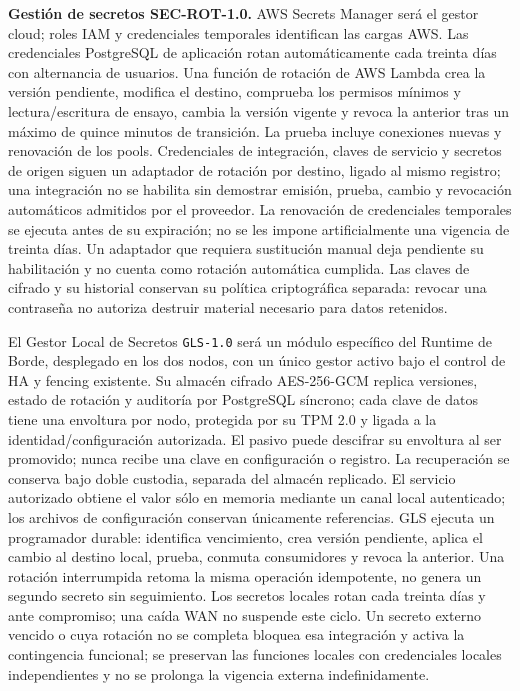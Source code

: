 \textbf{Gestión de secretos SEC-ROT-1.0.}
AWS Secrets Manager será el gestor cloud; roles IAM y credenciales temporales identifican las cargas AWS. Las credenciales PostgreSQL de aplicación rotan automáticamente cada treinta días con alternancia de usuarios. Una función de rotación de AWS Lambda crea la versión pendiente, modifica el destino, comprueba los permisos mínimos y lectura/escritura de ensayo, cambia la versión vigente y revoca la anterior tras un máximo de quince minutos de transición. La prueba incluye conexiones nuevas y renovación de los pools. Credenciales de integración, claves de servicio y secretos de origen siguen un adaptador de rotación por destino, ligado al mismo registro; una integración no se habilita sin demostrar emisión, prueba, cambio y revocación automáticos admitidos por el proveedor. La renovación de credenciales temporales se ejecuta antes de su expiración; no se les impone artificialmente una vigencia de treinta días. Un adaptador que requiera sustitución manual deja pendiente su habilitación y no cuenta como rotación automática cumplida. Las claves de cifrado y su historial conservan su política criptográfica separada: revocar una contraseña no autoriza destruir material necesario para datos retenidos.

El Gestor Local de Secretos \texttt{GLS-1.0} será un módulo específico del Runtime de Borde, desplegado en los dos nodos, con un único gestor activo bajo el control de HA y fencing existente. Su almacén cifrado AES-256-GCM replica versiones, estado de rotación y auditoría por PostgreSQL síncrono; cada clave de datos tiene una envoltura por nodo, protegida por su TPM 2.0 y ligada a la identidad/configuración autorizada. El pasivo puede descifrar su envoltura al ser promovido; nunca recibe una clave en configuración o registro. La recuperación se conserva bajo doble custodia, separada del almacén replicado. El servicio autorizado obtiene el valor sólo en memoria mediante un canal local autenticado; los archivos de configuración conservan únicamente referencias. GLS ejecuta un programador durable: identifica vencimiento, crea versión pendiente, aplica el cambio al destino local, prueba, conmuta consumidores y revoca la anterior. Una rotación interrumpida retoma la misma operación idempotente, no genera un segundo secreto sin seguimiento. Los secretos locales rotan cada treinta días y ante compromiso; una caída WAN no suspende este ciclo. Un secreto externo vencido o cuya rotación no se completa bloquea esa integración y activa la contingencia funcional; se preservan las funciones locales con credenciales locales independientes y no se prolonga la vigencia externa indefinidamente.

